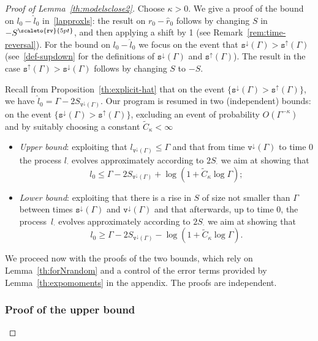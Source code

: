 \documentclass[AHL,Unicode,longabstracts,published]{cedram}
\newcommand{\gG}{\Gamma}
\newcommand{\ts}{\mathtt{s}}
\newcommand{\tsdown}{\ts^\downarrow}
\newcommand{\tsup}{\ts^\uparrow}
\newcommand{\ttv}{\mathtt{v}}
\newcommand{\tvdown}{\ttv^\downarrow}
\newcommand\mystrut{\rule{0pt}{6pt}}
\newcommand{\Srev}{S\mystrut^{\scaleto{\mathtt{rv}\mathstrut}{5pt}}}
\newcommand{\ls}{\widehat{l}}
\newcommand{\rs}{\widehat{r}}
\begin{document}
\begin{proof}[Proof of Lemma~\ref{th:modelsclose2}]
Choose $\kappa>0$. We give a proof of the bound on $ l_0-\ls_0$ in~\eqref{lapproxls}: the result on $r_0-\rs_0$ follows by changing $S$ in $-\Srev$, and then applying a shift by 1 (see Remark~\ref{rem:time-reversal}). For the bound on $ l_0-\ls_0$ we focus on the event that $\tsdown(\gG)>\tsup(\gG)$ (see~\eqref{def-supdown} for the definitions of $\tsdown(\gG)$ and $\tsup(\gG)$). The result in the case $\tsup(\gG)>\tsdown(\gG)$ follows by changing $S$ to $-S$.


Recall from Proposition~\ref{th:explicit-hat} that on the event $\{\tsdown(\Gamma)>\tsup(\Gamma)\}$, we have $\ls_0=\gG-2 S_{\tvdown(\gG)}$. Our program is resumed in two (independent) bounds: on the event $\{\tsdown(\Gamma)>\tsup(\Gamma)\}$, excluding an event of probability $O(\gG^{-\kappa})$ and by suitably choosing a constant $\widetilde{C}_\kappa<\infty$
\begin{itemize}
\item \emph{Upper bound}: exploiting that $l_{\tvdown(\gG)}\le \gG$ and that from time $\tvdown(\gG)$ to time 0 the process $l_\cdot $ evolves approximately according to $2 S_\cdot$ we aim at showing that
\begin{equation}\label{eq:upp-lv}
l_0\le \gG-2 S_{\tvdown(\gG)}+\log\left(1+\widetilde{C}_\kappa\log \gG\right);
\end{equation}
\item \emph{Lower bound}: exploiting that there is a rise in $S$ of size not smaller than $\gG$ between times $\tsdown(\Gamma)$ and $\tvdown(\gG)$ and that afterwards, up to time 0, the process~$l_\cdot $ evolves approximately according to $2 S_\cdot$ we aim at showing that
\begin{equation}\label{eq:low-lv}
l_0 \ge \gG-2 S_{\tvdown(\gG)}-\log\left(1+\widetilde{C}_\kappa\log \gG\right).
\end{equation}
\end{itemize}



We proceed now with the proofs of the two bounds, which rely on Lemma~\ref{th:forNrandom} and a control of the error terms provided by Lemma~\ref{th:expomoments} in the appendix. The proofs are independent.

\subsubsection{Proof of the upper bound}


\end{proof}
\end{document}
